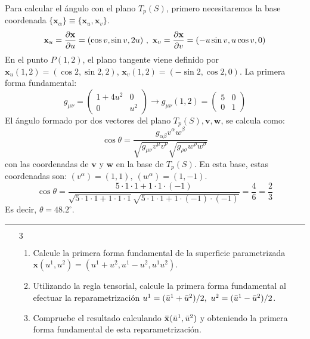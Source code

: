 Para calcular el ángulo con el plano $T_p(S)$, primero necesitaremos la base coordenada $\{ \mathbf{x}_\alpha  \}\equiv \{ \mathbf{x}_u,\mathbf{x}_v \}$.
$$
\mathbf{x}_u=\pdv{\mathbf{x}}{u}=(\cos v,\sin v,2u) \ , \ \mathbf{x}_v=\pdv{\mathbf{x}}{v}=(-u\sin v,u\cos v,0)
$$
En el punto $P(1,2)$, el plano tangente viene definido por $\mathbf{x}_u(1,2)=(\cos 2,\sin 2, 2)$, $\mathbf{x}_v(1,2)=(-\sin 2,\cos 2,0)$. La primera forma fundamental:
$$
g_{\mu \nu }=\left ( 
\begin{array}{cc}
     1+4u^2&0  \\
     0&u^2 
\end{array}
\right )\longrightarrow g_{\mu \nu }(1,2)=\left ( 
\begin{array}{cc}
     5&0  \\
     0&1 
\end{array} \right )
$$
El ángulo formado por dos vectores del plano $T_p(S), \mathbf{v},\mathbf{w}$, se calcula como:
$$
\cos \theta =\frac{g_{\alpha \beta }v^\alpha w^\beta }{\sqrt{g_{\mu \nu }v^\mu v^\nu }\sqrt{g_{\rho \sigma }w^\rho w^\sigma }}
$$
con las coordenadas de $\mathbf{v}$ y $\mathbf{w}$ en la base de $T_p(S)$. En esta base, estas coordenadas son: $(v^\alpha )=(1,1),\ (w^\alpha )=(1,-1)$.
$$
\cos \theta =\frac{5\cdot 1\cdot 1+1\cdot 1\cdot (-1)}{\sqrt{5\cdot 1\cdot 1+1\cdot 1\cdot 1}\sqrt{5\cdot 1\cdot 1+1\cdot (-1)\cdot (-1)}}=\frac{4}{6}=\frac{2}{3}
$$
Es decir, $\theta=48.2^\circ $.

\noindent\rule{\textwidth}{1pt}
\begin{enumerate}
    \item[$\boxed{3}$] 
    \begin{enumerate}
        \item Calcule la primera forma fundamental de la superficie parametrizada $\mathbf{x}(u^1,u^2)=(u^1+u^2,u^1-u^2,u^1u^2)$.
        \item Utilizando la regla tensorial, calcule la primera forma fundamental al efectuar la reparametrización $u^1=(\Bar{u}^1+\Bar{u}^2)/2,\ u^2=(\Bar{u}^1-\Bar{u}^2)/2$.
        \item Compruebe el resultado calculando $\mathbf{\Bar{x}}(\Bar{u}^1,\Bar{u}^2)$ y obteniendo la primera forma fundamental de esta reparametrización.
    \end{enumerate}
\end{enumerate}